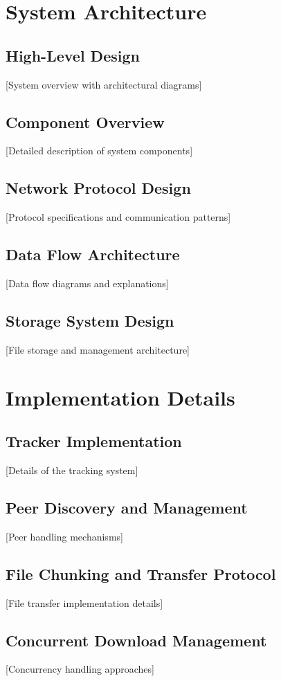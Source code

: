 \documentclass[12pt,a4paper]{report}
\begin{document}
\chapter{System Architecture}
\section{High-Level Design}
 [System overview with architectural diagrams]

\section{Component Overview}
 [Detailed description of system components]

\section{Network Protocol Design}
 [Protocol specifications and communication patterns]

\section{Data Flow Architecture}
 [Data flow diagrams and explanations]

\section{Storage System Design}
 [File storage and management architecture]

\chapter{Implementation Details}
\section{Tracker Implementation}
 [Details of the tracking system]

\section{Peer Discovery and Management}
 [Peer handling mechanisms]

\section{File Chunking and Transfer Protocol}
 [File transfer implementation details]

\section{Concurrent Download Management}
 [Concurrency handling approaches]
\end{document}
